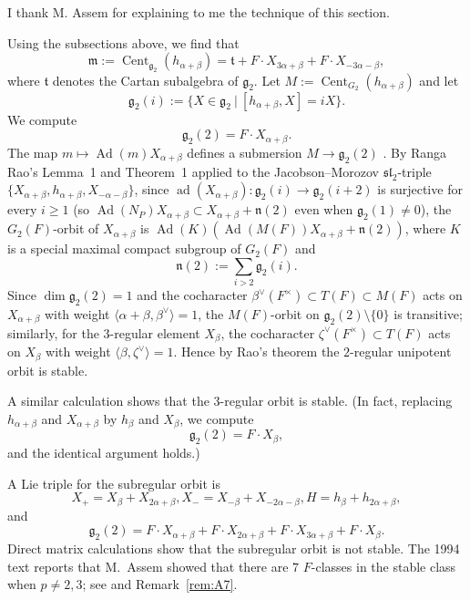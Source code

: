 \documentclass[12pt,letterpaper]{amsart}
\theoremstyle{plain}
\theoremstyle{definition}
\theoremstyle{remark}
\theoremstyle{definition}
\DeclareMathOperator{\Cent}{Cent}
\DeclareMathOperator{\Ad}{Ad}
\DeclareMathOperator{\ad}{ad}
\begin{document}
I thank M. Assem for explaining to me the technique of this section.

Using the subsections above, we find that
\[
{\mathfrak m}:=\Cent_{{\mathfrak g}_2}(h_{\alpha +\beta})
={\mathfrak t}+F\cdot X_{3\alpha +\beta}+F\cdot X_{-3\alpha -\beta},
\]
where ${\mathfrak t}$ denotes the Cartan subalgebra of ${\mathfrak g}_2$. Let
$M:=\Cent_{G_2}(h_{\alpha +\beta})$ and let
\[
{\mathfrak g}_2(i):=\{X\in{\mathfrak g}_2\ |\ [h_{\alpha +\beta},X]=iX\}.
\]
We compute
\[
{\mathfrak g}_2(2)=F\cdot X_{\alpha +\beta}.
\]
The map $m\longmapsto \Ad(m)X_{\alpha +\beta}$ defines a submersion
$M\rightarrow {\mathfrak g}_2(2)$ \cite[Ch.~III, \S 4.14]{SS86}. By Ranga Rao's
Lemma~1 and Theorem~1 \cite[pp.~506--507]{Ra72} applied to the Jacobson--Morozov
$\mathfrak{sl}_2$-triple $\{X_{\alpha+\beta},h_{\alpha+\beta},X_{-\alpha-\beta}\}$,
since $\ad(X_{\alpha+\beta}):\mathfrak g_2(i)\to\mathfrak g_2(i+2)$ is surjective
for every $i\ge 1$ (so $\Ad(N_P)X_{\alpha+\beta}\subset X_{\alpha+\beta}+\mathfrak n(2)$
even when $\mathfrak g_2(1)\neq0$), the $G_2(F)$-orbit of $X_{\alpha +\beta}$ is
$\Ad(K)(\Ad(M(F))X_{\alpha +\beta}+{\mathfrak n}(2))$, where
$K$ is a special maximal compact subgroup of $G_2(F)$ and
\[
{\mathfrak n}(2):=\sum_{i >2}{\mathfrak g}_2(i).
\]
Since $\dim{\mathfrak g}_2(2)=1$ and the cocharacter $\beta^\vee(F^\times)\subset T(F)\subset M(F)$
acts on $X_{\alpha+\beta}$ with weight $\langle\alpha+\beta,\beta^\vee\rangle=1$,
the $M(F)$-orbit on $\mathfrak g_2(2)\setminus\{0\}$ is transitive; similarly,
for the $3$-regular element $X_\beta$, the cocharacter
$\zeta^\vee(F^\times)\subset T(F)$ acts on $X_\beta$ with weight
$\langle\beta,\zeta^\vee\rangle=1$. Hence by Rao's theorem the $2$-regular
unipotent orbit is stable.

A similar calculation shows that the $3$-regular orbit is stable.
(In fact, replacing $h_{\alpha +\beta}$ and $X_{\alpha +\beta}$
by $h_{\beta}$ and $X_{\beta}$, we compute
\[
{\mathfrak g}_2(2)=F\cdot X_{\beta},
\]
and the identical argument holds.)

A Lie triple for the subregular orbit is
\[
X_+=X_\beta+X_{2\alpha +\beta},
X_-=X_{-\beta}+X_{-2\alpha -\beta},
H=h_{\beta}+h_{2\alpha +\beta},
\]
and
\[
{\mathfrak g}_2(2)=
F\cdot X_{\alpha +\beta}+F\cdot X_{2\alpha +\beta}
+F\cdot X_{3\alpha +\beta}+F\cdot X_{\beta}.
\]
Direct matrix calculations show that the subregular orbit is
not stable. The 1994 text reports that M.~Assem showed that there are $7$
$F$-classes in the stable class when $p\not= 2,3$; see \cite{As98} and
Remark~\ref{rem:A7}.
\end{document}
